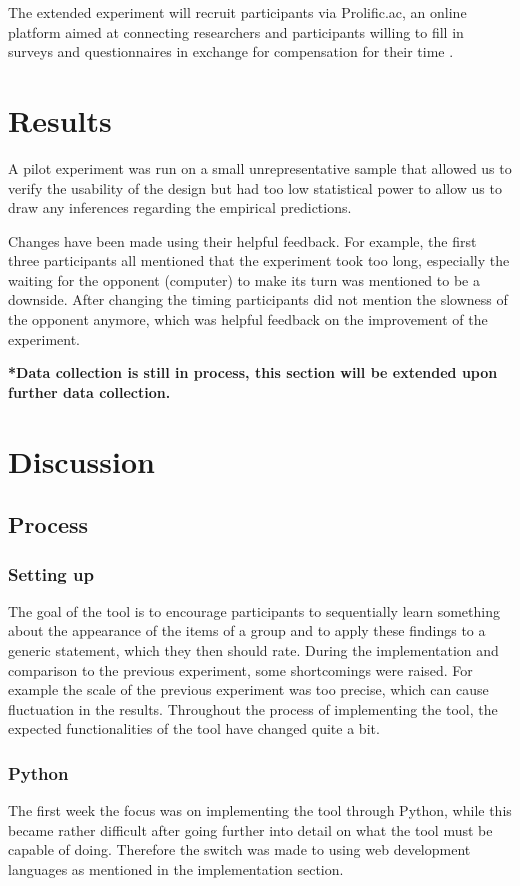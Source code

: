 \documentclass[twoside]{uva-inf-bachelor-thesis}
\theoremstyle{definition}
\begin{document}
The extended experiment will recruit participants via Prolific.ac, an online platform aimed
at connecting researchers and participants willing to fill in surveys and questionnaires in exchange for compensation for their time \cite{PALAN201822}.

\chapter{Results}
A pilot experiment was run on a small unrepresentative sample that allowed us to verify the usability of the design but had too low statistical power to allow us to draw any inferences regarding the empirical predictions. 

Changes have been made using their helpful feedback. For example, the first three participants all mentioned that the experiment took too long, especially the waiting for the opponent (computer) to make its turn was mentioned to be a downside. After changing the timing participants did not mention the slowness of the opponent anymore, which was helpful feedback on the improvement of the experiment.

\textbf{*Data collection is still in process, this section will be extended upon further data collection.}

\chapter{Discussion}
\section{Process}
\subsection{Setting up}
The goal of the tool is to encourage participants to sequentially learn something about the appearance of the items of a group and to apply these findings to a generic statement, which they then should rate. During the implementation and comparison to the previous experiment, some shortcomings were raised. For example the scale of the previous experiment was too precise, which can cause fluctuation in the results. Throughout the process of implementing the tool, the expected functionalities of the tool have changed quite a bit. 
\subsection{Python}
The first week the focus was on implementing the tool through Python, while this became rather difficult after going further into detail on what the tool must be capable of doing. Therefore the switch was made to using web development languages as mentioned in the implementation section. 
\end{document}
